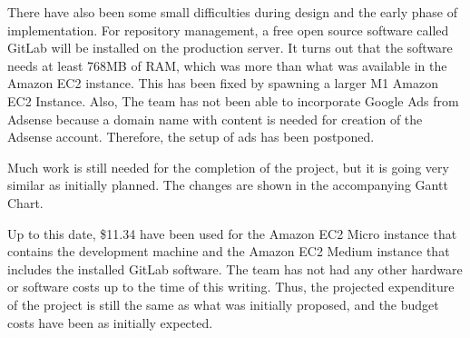 There have also been some small difficulties during design and the early phase
of implementation. For repository management, a free open source software called
GitLab will be installed on the production server. It turns out that the
software needs at least 768MB of RAM, which was more than what was available in
the Amazon EC2 instance. This has been fixed by spawning a larger M1 Amazon EC2
Instance. Also, The team has not been able to incorporate Google Ads from
Adsense because a domain name with content is needed for creation of the Adsense
account. Therefore, the setup of ads has been postponed.

Much work is still needed for the completion of the project, but it is going
very similar as initially planned. The changes are shown in the accompanying
Gantt Chart. 

Up to this date, \$11.34 have been used for the Amazon EC2 Micro instance that
contains the development machine and the Amazon EC2 Medium instance that
includes the installed GitLab software. The team has not had any other hardware
or software costs up to the time of this writing. Thus, the projected
expenditure of the project is still the same as what was initially proposed,
and the budget costs have been as initially expected.
